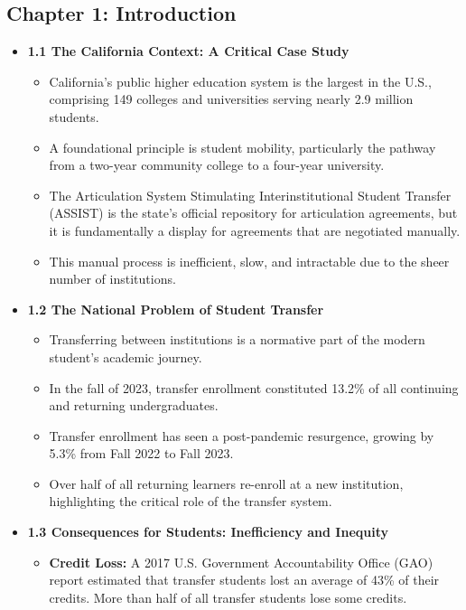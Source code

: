 \documentclass[11pt]{article}
\begin{document}
\subsection*{Chapter 1: Introduction}
\begin{itemize}
    \item \textbf{1.1 The California Context: A Critical Case Study}
    \begin{itemize}
        \item California's public higher education system is the largest in the U.S., comprising 149 colleges and universities serving nearly 2.9 million students.
        \item A foundational principle is student mobility, particularly the pathway from a two-year community college to a four-year university.
        \item The Articulation System Stimulating Interinstitutional Student Transfer (ASSIST) is the state's official repository for articulation agreements, but it is fundamentally a display for agreements that are negotiated manually.
        \item This manual process is inefficient, slow, and intractable due to the sheer number of institutions.
    \end{itemize}
    \item \textbf{1.2 The National Problem of Student Transfer}
    \begin{itemize}
        \item Transferring between institutions is a normative part of the modern student's academic journey.
        \item In the fall of 2023, transfer enrollment constituted 13.2\% of all continuing and returning undergraduates.
        \item Transfer enrollment has seen a post-pandemic resurgence, growing by 5.3\% from Fall 2022 to Fall 2023.
        \item Over half of all returning learners re-enroll at a new institution, highlighting the critical role of the transfer system.
    \end{itemize}
    \item \textbf{1.3 Consequences for Students: Inefficiency and Inequity}
    \begin{itemize}
        \item \textbf{Credit Loss:} A 2017 U.S. Government Accountability Office (GAO) report estimated that transfer students lost an average of 43\% of their credits. More than half of all transfer students lose some credits.

\end{itemize}
\end{itemize}
\end{document}
